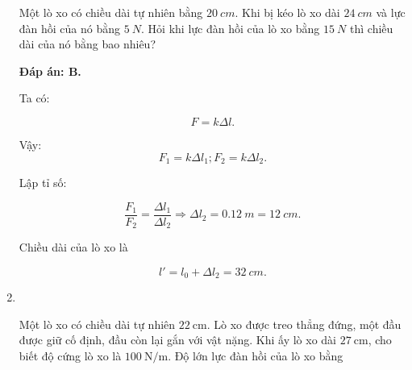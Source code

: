 \begin{enumerate}[label=\bfseries Câu \arabic*:, leftmargin=1.5cm]
	
	{Một lò xo có chiều dài tự nhiên bằng $\SI{20}{cm}$. Khi bị kéo lò xo dài $\SI{24}{cm}$ và lực đàn hồi của nó bằng $\SI{5}{N}$. Hỏi khi lực đàn hồi của lò xo bằng $\SI{15}{N}$ thì chiều dài của nó bằng bao nhiêu?
		
	}
	
	\hideall
	{	
		\textbf{Đáp án: B.}
		
		Ta có:
		
		$$F = k \Delta l.$$
		
		Vậy: 
		$$F_1 = k \Delta l_1; F_2 = k \Delta l_2.$$
		
		Lập tỉ số:
		
		$$\dfrac{F_1}{F_2} = \dfrac{\Delta l_1}{\Delta l_2} \Rightarrow \Delta l_2 = \SI{0,12}{m} = \SI{12}{cm}.$$
		
		Chiều dài của lò xo là
		
		$$l' = l_0 + \Delta l_2 = \SI{32}{cm}.$$
	}
	
	
	\item{}\\
	{Một lò xo có chiều dài tự nhiên $\SI{22}{\centi\meter}$. Lò xo được treo thẳng đứng, một đầu được giữ cố định, đầu còn lại gắn với vật nặng. Khi ấy lò xo dài $\SI{27}{\centi\meter}$, cho biết độ cứng lò xo là $\SI{100}{\newton/\meter}$. Độ lớn lực đàn hồi của lò xo bằng
	
}


\end{enumerate}
